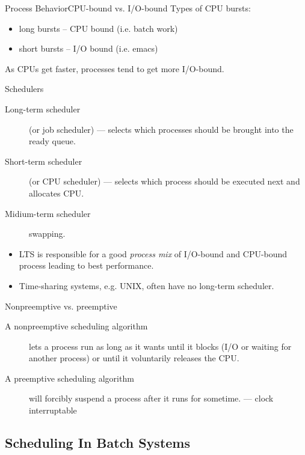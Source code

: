 \begin{frame}{Process Behavior}{CPU-bound vs. I/O-bound}
  Types of CPU bursts:
  \begin{itemize}
  \item long bursts -- CPU bound (i.e. batch work)
  \item short bursts -- I/O bound (i.e. emacs)
  \end{itemize}
  \begin{center}
  \end{center}
  As CPUs get faster, processes tend to get more I/O-bound.
\end{frame}

\begin{frame}{Schedulers}
  \begin{description}
  \item[Long-term scheduler] (or job scheduler) --- selects which processes should be brought into the
    ready queue.
  \item[Short-term scheduler] (or CPU scheduler) --- selects which process should be executed next and
    allocates CPU.
  \item[Midium-term scheduler] swapping.
  \end{description}
  \begin{itemize}
  \item LTS is responsible for a good \emph{process mix} of I/O-bound and CPU-bound process leading
    to best performance.
  \item Time-sharing systems, e.g. UNIX, often have no long-term scheduler.
  \end{itemize}
\end{frame}

\begin{frame}{Nonpreemptive vs. preemptive}
  \begin{description}
  \item[A nonpreemptive scheduling algorithm] lets a process run as long as it wants until it
    blocks (I/O or waiting for another process) or until it voluntarily releases the CPU. 
  \item[A preemptive scheduling algorithm] will forcibly suspend a process after it runs for
    sometime. --- clock interruptable
  \end{description}
\end{frame}

\subsection{Scheduling In Batch Systems}
\label{sec:sched-batch-syst}

